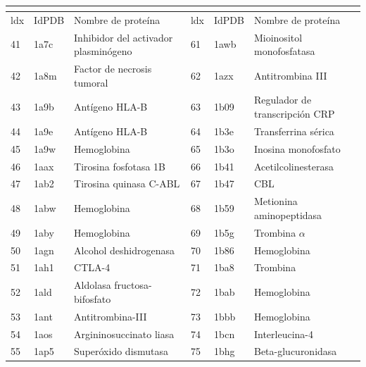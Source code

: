  	\begin{table}[H]
 		\centering
 		\begin{footnotesize}
 			\begin{tabular}{||l|ll||l|ll||}
 				\multicolumn{6}{c}{}                                         \\
 				\hline
 				ldx & IdPDB & Nombre de prote\'{i}na               & ldx & IdPDB & Nombre de prote\'{i}na           \\ 
 				\hline
 				41  & 1a7c  & Inhibidor del activador plasminógeno & 61 & 1awb  & Mioinositol monofosfatasa        \\
 				42  & 1a8m  & Factor de necrosis tumoral           & 62 & 1azx  & Antitrombina III                 \\
 				43  & 1a9b  & Antígeno HLA-B                       & 63 & 1b09  & Regulador de transcripción CRP   \\
 				44  & 1a9e  & Antígeno HLA-B                       & 64 & 1b3e  & Transferrina sérica              \\
 				45  & 1a9w  & Hemoglobina                          & 65 & 1b3o  & Inosina monofosfato              \\
 				46  & 1aax  & Tirosina fosfotasa 1B                & 66 & 1b41  & Acetilcolinesterasa              \\
 				47  & 1ab2  & Tirosina quinasa C-ABL               & 67 & 1b47  & CBL                              \\
 				48  & 1abw  & Hemoglobina                          & 68 & 1b59  & Metionina aminopeptidasa         \\
 				49  & 1aby  & Hemoglobina                          & 69 & 1b5g  & Trombina $\alpha$                \\
 				50  & 1agn  & Alcohol deshidrogenasa               & 70 & 1b86  & Hemoglobina                      \\
 				51  & 1ah1  & CTLA-4                               & 71 & 1ba8  & Trombina                         \\
 				52  & 1ald  & Aldolasa fructosa-bifosfato          & 72 & 1bab  & Hemoglobina                      \\
 				53  & 1ant  & Antitrombina-III                     & 73 & 1bbb  & Hemoglobina                      \\
 				54  & 1aos  & Argininosuccinato liasa              & 74 & 1bcn  & Interleucina-4                   \\
 				55  & 1ap5  & Superóxido dismutasa                 & 75 & 1bhg  & Beta-glucuronidasa               \\

\end{tabular}
\end{footnotesize}
\end{table}
